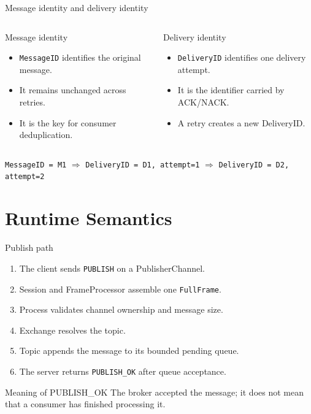 \documentclass[aspectratio=169,10pt]{beamer}
\newcommand{\code}[1]{\texttt{\small #1}}
\begin{document}
\begin{frame}{Message identity and delivery identity}
  \begin{columns}[T,onlytextwidth]
      \begin{block}{Message identity}
        \begin{itemize}
          \item \code{MessageID} identifies the original message.
          \item It remains unchanged across retries.
          \item It is the key for consumer deduplication.
        \end{itemize}
      \end{block}
      \begin{block}{Delivery identity}
        \begin{itemize}
          \item \code{DeliveryID} identifies one delivery attempt.
          \item It is the identifier carried by ACK/NACK.
          \item A retry creates a new DeliveryID.
        \end{itemize}
      \end{block}
  \end{columns}
  \vspace{.5em}
  \begin{center}
    \code{MessageID = M1} \quad $\Rightarrow$ \quad
    \code{DeliveryID = D1, attempt=1} \quad $\Rightarrow$ \quad
    \code{DeliveryID = D2, attempt=2}
  \end{center}
\end{frame}

\section{Runtime Semantics}

\begin{frame}{Publish path}
  \begin{enumerate}
    \item The client sends \code{PUBLISH} on a PublisherChannel.
    \item Session and FrameProcessor assemble one \code{FullFrame}.
    \item Process validates channel ownership and message size.
    \item Exchange resolves the topic.
    \item Topic appends the message to its bounded pending queue.
    \item The server returns \code{PUBLISH\_OK} after queue acceptance.
  \end{enumerate}
  \vspace{.5em}
  \begin{alertblock}{Meaning of PUBLISH\_OK}
    The broker accepted the message; it does not mean that a consumer has
    finished processing it.
  \end{alertblock}
\end{frame}
\end{document}
